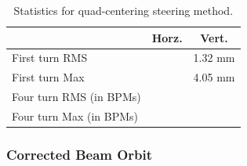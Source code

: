 \begin{table}[h]
\centering
\caption{Statistics for quad-centering steering method.}
\label{tab:steeringresults}
\begin{tabular}{|l|c|c|}
& Horz. & Vert. \\
\hline
First turn RMS & & 1.32 mm\\
First turn Max & & 4.05 mm\\
Four turn RMS (in BPMs)& & \\
Four turn Max (in BPMs)& & \\
\hline
\end{tabular}
\end{table}








 





\subsubsection{Corrected Beam Orbit}


